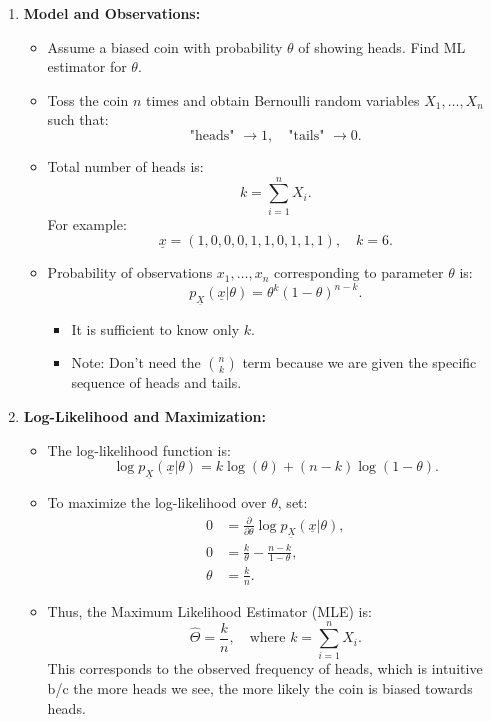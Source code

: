 \begin{example}
    \begin{enumerate}
        \item \textbf{Model and Observations:}
        \begin{itemize}
            \item Assume a biased coin with probability $\theta$ of showing heads. Find ML estimator for $\theta$.
            \item Toss the coin $n$ times and obtain Bernoulli random variables $X_1, \dots, X_n$ such that:
            \[
            \text{"heads" } \to 1, \quad \text{"tails" } \to 0.
            \]
            \item Total number of heads is:
            \[
            k = \sum_{i=1}^n X_i.
            \]
            For example:
            \[
            \underline{x} = (1, 0, 0, 0, 1, 1, 0, 1, 1, 1), \quad k = 6.
            \]
            \item Probability of observations $x_1,\ldots,x_n$ corresponding to parameter $\theta$ is:
            \[
            p_{\underline{X}}(\underline{x} | \theta) = \theta^k (1 - \theta)^{n - k}.
            \]
            \begin{itemize}
                \item It is sufficient to know only $k$.
                \item Note: Don't need the $\binom{n}{k}$ term because we are given the specific sequence of heads and tails.
            \end{itemize}
        \end{itemize}
        
        \item \textbf{Log-Likelihood and Maximization:}
        \begin{itemize}
            \item The log-likelihood function is:
            \[
            \log p_{\underline{X}}(\underline{x} | \theta) = k \log(\theta) + (n - k) \log(1 - \theta).
            \]
            \item To maximize the log-likelihood over $\theta$, set:
            \begin{align*}
            0 &= \frac{\partial}{\partial \theta} \log p_{\underline{X}}(\underline{x} | \theta), \\
            0 &= \frac{k}{\theta} - \frac{n - k}{1 - \theta}, \\
            \theta &= \frac{k}{n}.
            \end{align*}
            \item Thus, the Maximum Likelihood Estimator (MLE) is:
            \[
            \hat{\Theta} = \frac{k}{n}, \quad \text{where } k = \sum_{i=1}^n X_i.
            \]
            This corresponds to the observed frequency of heads, which is intuitive b/c the more heads we see, the more likely the coin is biased towards heads.
        \end{itemize}
        

\end{enumerate}
\end{example}
